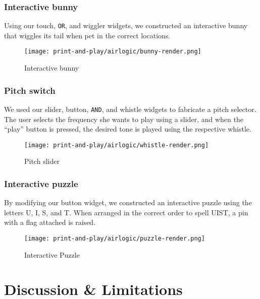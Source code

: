       \subsubsection{Interactive bunny}
        Using our touch, \texttt{OR}, and wiggler widgets, we constructed
        an interactive bunny that wiggles its tail when pet in the
        correct locations.

        \begin{figure}[h]
          \centering
          \texttt{[image: print-and-play/airlogic/bunny-render.png]}
          \caption{Interactive bunny}
          \label{fig:app-bunny}
        \end{figure}
      
      \subsubsection{Pitch switch}
        \label{sec:pitch}
        We used our slider, button, \texttt{AND}, and whistle widgets to
        fabricate a pitch selector. The user selects the frequency she wants to
        play using a slider, and when the ``play'' button is pressed, the
        desired tone is played using the respective whistle.

        \begin{figure}[h]
          \centering
          \texttt{[image: print-and-play/airlogic/whistle-render.png]}
          \caption{Pitch slider}
          \label{fig:app-slider}
        \end{figure}
      
      \subsubsection{Interactive puzzle}
        \label{sec:puzzle}
        By modifying our button widget, we constructed an interactive
        puzzle using the letters U, I, S, and T. When arranged in the
        correct order to spell UIST, a pin with a flag attached is raised.

        \begin{figure}[h]
          \centering
          \texttt{[image: print-and-play/airlogic/puzzle-render.png]}
          \caption{Interactive Puzzle}
          \label{fig:app-slider}
        \end{figure}
      
  \section{Discussion \& Limitations}
